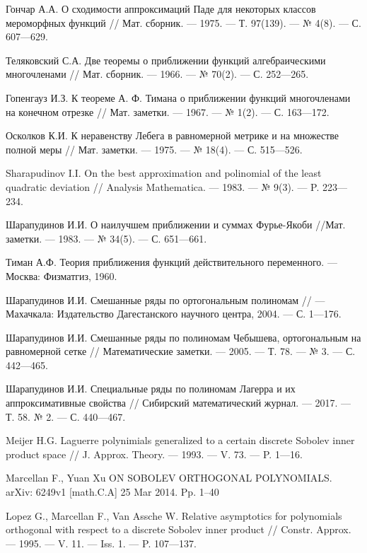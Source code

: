 \begin{thebibliography}{111}
{Гончар А.А.}
 О сходимости аппроксимаций Паде для некоторых классов мероморфных функций
// Мат. сборник. --- 1975. --- Т. 97(139). --- № 4(8). --- С. 607---629.


{Теляковский С.А.}
 Две теоремы о приближении функций алгебраическими многочленами
// Мат. сборник. --- 1966. --- № 70(2). --- С. 252---265.


{Гопенгауз И.З.}
 К теореме А. Ф. Тимана о приближении функций многочленами на конечном отрезке
// Мат. заметки. --- 1967. --- № 1(2). --- С. 163---172.


{Осколков К.И.}
 К неравенству Лебега в равномерной метрике и на множестве полной меры
// Мат.  заметки. --- 1975. --- № 18(4). --- С. 515---526.


{Sharapudinov I.I.}
 On the best approximation and polinomial of the least quadratic deviation
// Analysis Mathematica. --- 1983. --- № 9(3). --- P. 223---234.


{Шарапудинов И.И.}
 О наилучшем приближении и суммах Фурье-Якоби
//Мат. заметки. --- 1983. --- № 34(5). --- С. 651---661.


{Тиман А.Ф.} Теория приближения функций действительного переменного. --- Москва: Физматгиз, 1960.


{Шарапудинов И.И.}
Смешанные ряды по ортогональным полиномам // --- Махачкала: Издательство Дагестанского научного центра, 2004. --- С. 1---176.


{Шарапудинов И.И.}
Смешанные ряды по полиномам Чебышева, ортогональным на равномерной сетке // Математические заметки. --- 2005. --- Т. 78. --- № 3. --- С. 442–--465.


{Шарапудинов И.И.}
Специальные ряды по полиномам Лагерра и их аппроксимативные свойства // Сибирский математический журнал. --- 2017. --- Т. 58. № 2. --- С. 440---467.


{Meijer H.G.}
Laguerre polynimials generalized to a certain discrete Sobolev inner product space // J. Approx. Theory. --- 1993. --- V. 73. --- P. 1---16.


{Marcellan F., Yuan Xu}
ON SOBOLEV ORTHOGONAL POLYNOMIALS. arXiv: 6249v1 [math.C.A] 25 Mar 2014. Pp. 1--40


{Lopez G., Marcellan F., Van Assche W.}
Relative asymptotics for polynomials orthogonal with respect to a discrete Sobolev inner product // Constr. Approx. --- 1995. --- V. 11. --- Iss. 1. --- P. 107---137.



\end{thebibliography}
